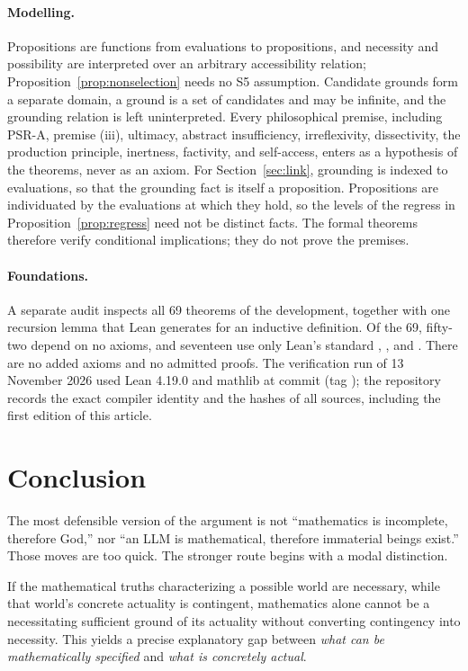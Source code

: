 \documentclass[11pt,letterpaper]{article}
\theoremstyle{plain}
\theoremstyle{definition}
\begin{document}
\paragraph{Modelling.} Propositions are functions from evaluations to propositions, and necessity and possibility are interpreted over an arbitrary accessibility relation; Proposition~\ref{prop:nonselection} needs no S5 assumption. Candidate grounds form a separate domain, a ground is a set of candidates and may be infinite, and the grounding relation is left uninterpreted. Every philosophical premise, including PSR-A, premise (iii), ultimacy, abstract insufficiency, irreflexivity, dissectivity, the production principle, inertness, factivity, and self-access, enters as a hypothesis of the theorems, never as an axiom. For Section~\ref{sec:link}, grounding is indexed to evaluations, so that the grounding fact is itself a proposition. Propositions are individuated by the evaluations at which they hold, so the levels of the regress in Proposition~\ref{prop:regress} need not be distinct facts. The formal theorems therefore verify conditional implications; they do not prove the premises.

\paragraph{Foundations.} A separate audit inspects all 69 theorems of the development, together with one recursion lemma that Lean generates for an inductive definition. Of the 69, fifty-two depend on no axioms, and seventeen use only Lean's standard , , and . There are no added axioms and no admitted proofs. The verification run of 13 November 2026 used Lean 4.19.0 and mathlib at commit  (tag ); the repository records the exact compiler identity and the hashes of all sources, including the first edition of this article.

\section{Conclusion}
\label{sec:conclusion}

The most defensible version of the argument is not ``mathematics is incomplete, therefore God,'' nor ``an LLM is mathematical, therefore immaterial beings exist.'' Those moves are too quick. The stronger route begins with a modal distinction.

If the mathematical truths characterizing a possible world are necessary, while that world's concrete actuality is contingent, mathematics alone cannot be a necessitating sufficient ground of its actuality without converting contingency into necessity. This yields a precise explanatory gap between \emph{what can be mathematically specified} and \emph{what is concretely actual}.
\end{document}
